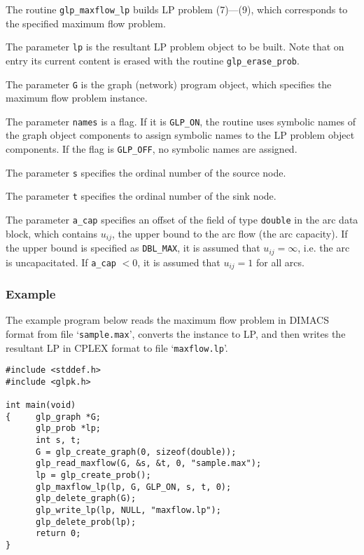 The routine \verb|glp_maxflow_lp| builds LP problem (7)---(9), which
corresponds to the specified maximum flow problem.

The parameter \verb|lp| is the resultant LP problem object to be built.
Note that on entry its current content is erased with the routine
\verb|glp_erase_prob|.

The parameter \verb|G| is the graph (network) program object, which
specifies the maximum flow problem instance.

The parameter \verb|names| is a flag. If it is \verb|GLP_ON|, the
routine uses symbolic names of the graph object components to assign
symbolic names to the LP problem object components. If the flag is
\verb|GLP_OFF|, no symbolic names are assigned.

The parameter \verb|s| specifies the ordinal number of the source node.

The parameter \verb|t| specifies the ordinal number of the sink node.

The parameter \verb|a_cap| specifies an offset of the field of type
\verb|double| in the arc data block, which contains $u_{ij}$, the upper
bound to the arc flow (the arc capacity). If the upper bound is
specified as \verb|DBL_MAX|, it is assumed that $u_{ij}=\infty$, i.e.
the arc is uncapacitated. If \verb|a_cap| $<0$, it is assumed that
$u_{ij}=1$ for all arcs.

\subsubsection*{Example}

The example program below reads the maximum flow problem in DIMACS
format from file `\verb|sample.max|', converts the instance to LP, and
then writes the resultant LP in CPLEX format to file
`\verb|maxflow.lp|'.

\begin{footnotesize}
\begin{verbatim}
#include <stddef.h>
#include <glpk.h>

int main(void)
{     glp_graph *G;
      glp_prob *lp;
      int s, t;
      G = glp_create_graph(0, sizeof(double));
      glp_read_maxflow(G, &s, &t, 0, "sample.max");
      lp = glp_create_prob();
      glp_maxflow_lp(lp, G, GLP_ON, s, t, 0);
      glp_delete_graph(G);
      glp_write_lp(lp, NULL, "maxflow.lp");
      glp_delete_prob(lp);
      return 0;
}
\end{verbatim}
\end{footnotesize}

